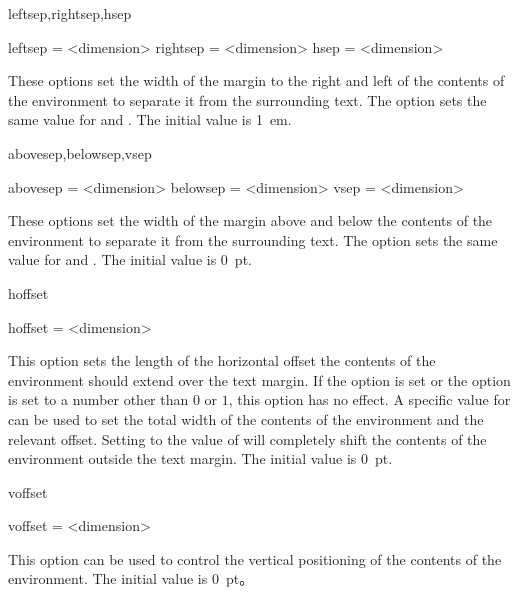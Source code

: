\documentclass{ctxdoc}
\begin{document}
\begin{documentation}
 \begin{function}{leftsep,rightsep,hsep}
   \begin{syntax}
     leftsep  = <dimension>
     rightsep = <dimension>
     hsep     = <dimension>
   \end{syntax}
   These options set the width of the margin to the right and left of the contents of the  environment to separate it from the surrounding text. The option  sets the same value for  and . The initial value is \qty{1}{em}.
 \end{function}

 \begin{function}{abovesep,belowsep,vsep}
   \begin{syntax}
     abovesep = <dimension>
     belowsep = <dimension>
     vsep     = <dimension>
  \end{syntax}
  These options set the width of the margin above and below the contents of the  environment to separate it from the surrounding text. The option  sets the same value for  and . The initial value is \qty{0}{pt}.
 \end{function}

 \begin{function}{hoffset}
   \begin{syntax}
     hoffset = <dimension>
   \end{syntax}
   This option sets the length of the horizontal offset the contents of the  environment should extend over the text margin.
   If the option  is set or the option  is set to a number other than $0$ or $1$, this option has no effect.
   A specific value for  can be used to set the total width of the contents of the  environment and the relevant offset.
   Setting  to the value of  will completely shift the contents of the  environment outside the text margin.
   The initial value is \qty{0}{pt}.
 \end{function}

 \begin{function}{voffset}
   \begin{syntax}
     voffset = <dimension>
   \end{syntax}
   This option can be used to control the vertical positioning of the contents of the  environment.
   The initial value is \qty{0}{pt}。
 \end{function}


\end{documentation}
\end{document}
